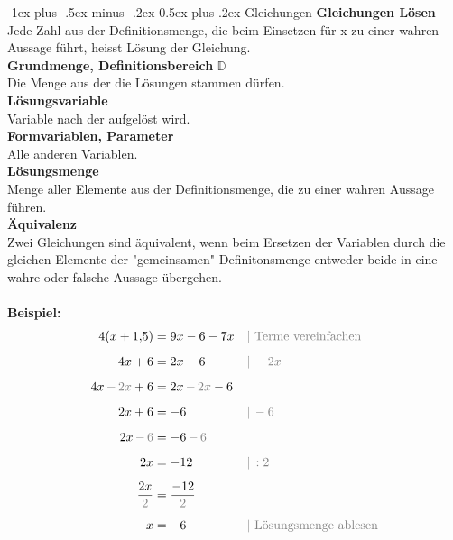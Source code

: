 \documentclass[10pt,landscape]{article}
\makeatletter
\renewcommand{\section}{\@startsection{section}{1}{0mm}%
                                {-1ex plus -.5ex minus -.2ex}%
                                {0.5ex plus .2ex}%
                                {\normalfont\large\bfseries}}
\makeatother
\begin{document}
\begin{multicols}{3}
    \section{Gleichungen}
    \textbf{Gleichungen Lösen} \\
    Jede Zahl aus der Definitionsmenge, die beim Einsetzen für x zu einer wahren Aussage führt, heisst Lösung der Gleichung. \\
    \textbf{Grundmenge, Definitionsbereich} $\mathbb{D}$ \\
    Die Menge aus der die Lösungen stammen dürfen. \\
    \textbf{Lösungsvariable} \\
    Variable nach der aufgelöst wird. \\
    \textbf{Formvariablen, Parameter} \\
    Alle anderen Variablen. \\
    \textbf{Lösungsmenge} \\
    Menge aller Elemente aus der Definitionsmenge, die zu einer wahren Aussage führen. \\
    \textbf{Äquivalenz} \\
    Zwei Gleichungen sind äquivalent, wenn beim Ersetzen der Variablen durch die gleichen Elemente der "gemeinsamen" Definitonsmenge entweder beide in eine wahre oder falsche Aussage übergehen. \\~\\
    \textbf{Beispiel:}
    \begin{align*} 4(x+1{,}5) &= 9x - 6 - 7x &&{\color{gray}| \text{ Terme vereinfachen}} \\[5px] 4x + 6 &= 2x - 6 &&{\color{gray}|\, -2x} \\[5px] 4x {\color{gray}\,-\,2x} + 6 &= 2x {\color{gray}\,-\,2x} - 6 \\[5px] 2x + 6 &= -6 &&{\color{gray}|\, -6} \\[5px] 2x {\color{gray}\,-\,6} &= -6 {\color{gray}\,-\,6} \\[5px] 2x &= -12 &&{\color{gray}|\, :2} \\[5px] \frac{2x}{\color{gray}2} &= \frac{-12}{\color{gray}2} \\[5px] x &= -6 &&{\color{gray}| \text{ Lösungsmenge ablesen}} \end{align*}

\end{multicols}
\end{document}
